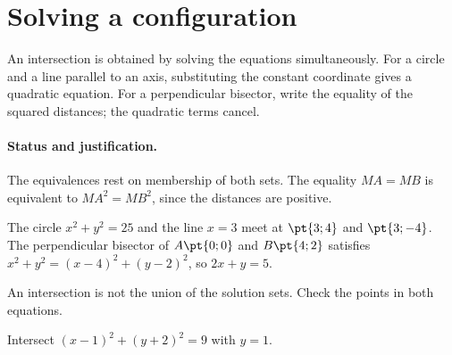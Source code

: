 \section{Solving a configuration}\label{C07-U4}
\begin{keypoint}
An intersection is obtained by solving the equations simultaneously. For a circle and a line parallel to an axis, substituting the constant coordinate gives a quadratic equation. For a perpendicular bisector, write the equality of the squared distances; the quadratic terms cancel.
\end{keypoint}
\paragraph{Status and justification.} The equivalences rest on membership of both sets. The equality $MA=MB$ is equivalent to $MA^2=MB^2$, since the distances are positive.
\begin{example}The circle $x^2+y^2=25$ and the line $x=3$ meet at $\pt{3;4}$ and $\pt{3;-4}$. The perpendicular bisector of $A\pt{0;0}$ and $B\pt{4;2}$ satisfies $x^2+y^2=(x-4)^2+(y-2)^2$, so $2x+y=5$.\end{example}\label{C07-EX4}
\begin{pitfall}An intersection is not the union of the solution sets. Check the points in both equations.\end{pitfall}
\begin{application}Intersect $(x-1)^2+(y+2)^2=9$ with $y=1$.\end{application}\label{C07-AP4}
\mxnewpage
